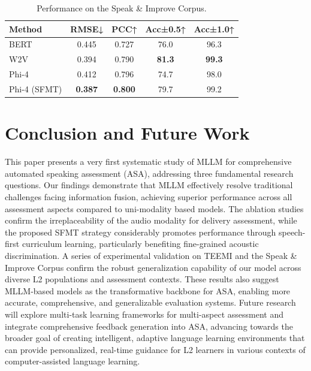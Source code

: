 \documentclass[conference]{IEEEtran}
\newcommand{\best}[1]{\textbf{#1}}
\begin{document}
\begin{table}[!ht]
\centering
\caption{Performance on the Speak \& Improve Corpus.}
\label{tab:slate_results}
\begin{tabular}{lcccc}
\toprule
\textbf{Method} & \textbf{RMSE↓} & \textbf{PCC↑} & \textbf{Acc±0.5↑} & \textbf{Acc±1.0↑} \\
\midrule
BERT~\cite{Devlin2019BERT} & 0.445 & 0.727 & 76.0 & 96.3 \\
W2V~\cite{Baevski20-Wav2Vec2} & 0.394 & 0.790 & \best{81.3} & \best{99.3} \\
Phi-4 & 0.412 & 0.796 & 74.7 & 98.0 \\
Phi-4 (SFMT) & \best{0.387} & \best{0.800} & 79.7 & 99.2 \\
\bottomrule
\end{tabular}
\end{table}

\section{Conclusion and Future Work}

This paper presents a very first systematic study of MLLM for comprehensive automated speaking assessment (ASA), addressing three fundamental research questions. Our findings demonstrate that MLLM effectively resolve traditional  challenges facing information fusion, achieving superior performance across all assessment aspects compared to uni-modality based models. The ablation studies confirm the irreplaceability of the audio modality for delivery assessment, while the proposed SFMT strategy considerably promotes performance through speech-first curriculum learning, particularly benefiting fine-grained acoustic discrimination. A series of experimental validation on TEEMI and the Speak \& Improve Corpus confirm the robust generalization capability of our model  across diverse L2 populations and assessment contexts. These results also suggest MLLM-based models as the transformative backbone for ASA, enabling more accurate, comprehensive, and generalizable evaluation systems. Future research will explore multi-task learning frameworks for multi-aspect assessment and integrate comprehensive feedback generation into ASA, advancing towards the broader goal of creating intelligent, adaptive language learning environments that can provide personalized, real-time guidance for L2 learners in various contexts of computer-assisted language learning.



\end{document}
